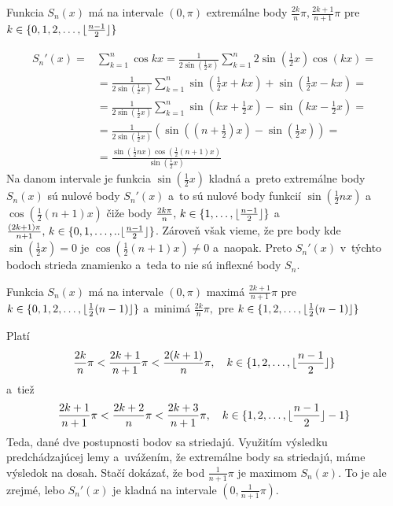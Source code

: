 \begin{lema}
    Funkcia $S_n(x)$ má na intervale $(0,\pi)$ extremálne body
    $\frac{2k}{n}\pi, \frac{2k+1}{n+1}\pi$ pre
    $k \in \{0,1,2,\dots,\lfloor \frac{n-1}{2} \rfloor \}$
\end{lema}
\begin{dokaz}
    \begin{align*}
        S_n'(x) =& \sum_{k=1}^n \cos kx = 
            \frac{1}{2\sin(\frac{1}{2}x)} \sum_{k=1}^n 2
            \sin(\frac{1}{2}x) \cos(kx) =\\
            &=\frac{1}{2\sin(\frac{1}{2}x)} \sum_{k=1}^n
                \sin(\frac{1}{2}x + kx) +
                \sin(\frac{1}{2}x - kx) = \\
            &=\frac{1}{2\sin(\frac{1}{2}x)} \sum_{k=1}^n
                \sin(kx + \frac{1}{2}x ) -
                \sin(kx - \frac{1}{2}x ) = \\
            &=\frac{1}{2\sin(\frac{1}{2}x)} 
                \left(
                    \sin\left((n+\frac{1}{2})x\right) -
                    \sin(\frac{1}{2}x)
                \right) = \\
            &=\frac{ \sin(\frac{1}{2}nx) \cos(\frac{1}{2}(n+1)x)}
                {\sin(\frac{1}{2} x)}
    \end{align*}
    Na danom intervale je funkcia $\sin(\frac{1}{2} x)$ kladná a~preto
    extremálne body $S_n(x)$ sú nulové
    body $S_n'(x)$ a~to sú nulové body funkcií
     $\sin(\frac{1}{2}nx)$ a $\cos(\frac{1}{2}(n+1)x)$ čiže
     body
     $\frac{2 k \pi}{n},\, k\in \{1,\dots,\lfloor \frac{n-1}{2} \rfloor\}$ a
     $\frac{(2k+1)\pi}{n+1},\, k\in
     \{0,1,\dots,..\lfloor \frac{n-1}{2} \rfloor\}$. Zároveň však
     vieme, že pre body kde $\sin(\frac{1}{2} x)=0$ je
     $\cos(\frac{1}{2}(n+1)x)\not=0$ a~naopak.
     Preto $S_n'(x)$ v~týchto bodoch strieda znamienko a~teda to nie
     sú inflexné body $S_n$.
\end{dokaz}

\begin{lema}
    Funkcia $S_n(x)$ má na intervale $(0,\pi)$ maximá
    $\frac{2k+1}{n+1}\pi$ pre $ k \in \{0,1,2,\dots,\lfloor \frac{1}{2}(n-1) \rfloor \}$
    a~minimá
    $\frac{2k}{n}\pi, $ pre
    $k \in \{1,2,\dots,\lfloor \frac{1}{2}(n-1) \rfloor \}$
\end{lema}
\begin{dokaz}
    Platí
    \begin{equation*}
        \frac{2k}{n}\pi < \frac{2k+1}{n+1}\pi < \frac{2(k+1)}{n} \pi,
        \quad k \in \{1,2,\dots,\lfloor \frac{n-1}{2} \rfloor \}
    \end{equation*}
    a~tiež
    \begin{equation*}
        \frac{2k+1}{n+1}\pi < \frac{2k+2}{n}\pi < \frac{2k+3}{n+1} \pi,
        \quad k \in\{1,2,\dots,\lfloor \frac{n-1}{2} \rfloor-1 \}
    \end{equation*}
    Teda, dané dve postupnosti bodov sa striedajú. Využitím výsledku
    predchádzajúcej lemy a~uvážením, že extremálne body sa striedajú,
    máme výsledok na dosah. Stačí dokázať, že bod $\frac{1}{n+1}\pi$
    je maximom $S_n(x)$. To je ale zrejmé, lebo
     $S_n'(x)$ je kladná na intervale $(0, \frac{1}{n+1}\pi)$.
\end{dokaz}

